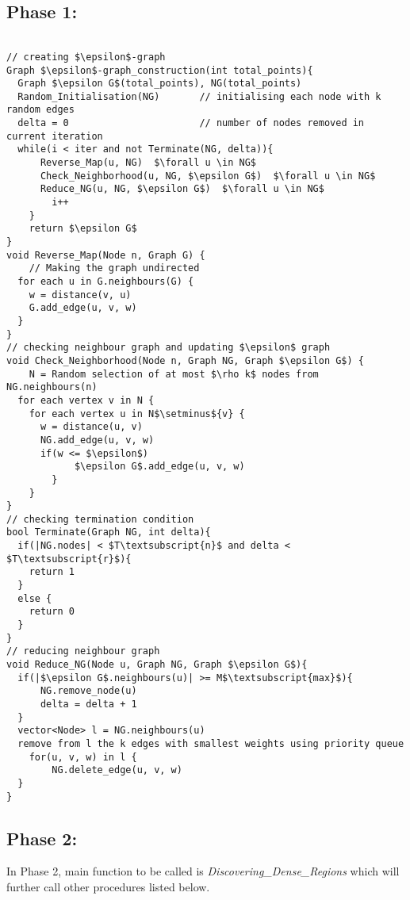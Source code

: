 \documentclass[acmsmall]{acmart}
\begin{document}
\subsection* {Phase 1:}
\begin{lstlisting}

// creating $\epsilon$-graph
Graph $\epsilon$-graph_construction(int total_points){
  Graph $\epsilon G$(total_points), NG(total_points)
  Random_Initialisation(NG)       // initialising each node with k random edges
  delta = 0                       // number of nodes removed in current iteration
  while(i < iter and not Terminate(NG, delta)){
      Reverse_Map(u, NG)  $\forall u \in NG$
      Check_Neighborhood(u, NG, $\epsilon G$)  $\forall u \in NG$
      Reduce_NG(u, NG, $\epsilon G$)  $\forall u \in NG$
        i++
    }
    return $\epsilon G$
}
void Reverse_Map(Node n, Graph G) {
    // Making the graph undirected
  for each u in G.neighbours(G) {
    w = distance(v, u)
    G.add_edge(u, v, w)
  }
}
// checking neighbour graph and updating $\epsilon$ graph
void Check_Neighborhood(Node n, Graph NG, Graph $\epsilon G$) {
    N = Random selection of at most $\rho k$ nodes from NG.neighbours(n) 
  for each vertex v in N {
    for each vertex u in N$\setminus${v} {
      w = distance(u, v)
      NG.add_edge(u, v, w)
      if(w <= $\epsilon$)
            $\epsilon G$.add_edge(u, v, w)
        }
    }
}
// checking termination condition
bool Terminate(Graph NG, int delta){
  if(|NG.nodes| < $T\textsubscript{n}$ and delta < $T\textsubscript{r}$){
    return 1
  } 
  else {
    return 0
  }
}
// reducing neighbour graph
void Reduce_NG(Node u, Graph NG, Graph $\epsilon G$){
  if(|$\epsilon G$.neighbours(u)| >= M$\textsubscript{max}$){
      NG.remove_node(u)
      delta = delta + 1
  }
  vector<Node> l = NG.neighbours(u) 
  remove from l the k edges with smallest weights using priority queue
    for(u, v, w) in l {
        NG.delete_edge(u, v, w)
  }
}
\end{lstlisting}

\subsection* {Phase 2:}
In Phase 2, main function to be called is \textit{Discovering\_Dense\_Regions} which will further call other procedures listed below.
\end{document}
